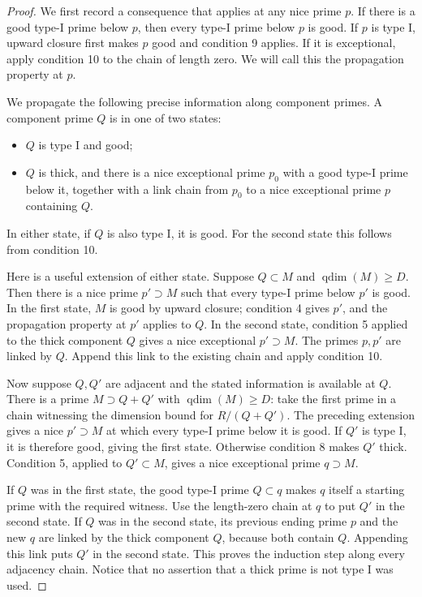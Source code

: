 \documentclass[11pt,a4paper]{article}
\numberwithin{equation}{section}
\theoremstyle{remark}\newtheorem{remark}[theorem]{Remark}
\begin{document}
\begin{proof}
We first record a consequence that applies at any nice prime
\(p\).  If there is a good type-I prime below \(p\), then
every type-I prime below \(p\) is good.  If \(p\) is type I,
upward closure first makes \(p\) good and condition 9 applies.
If it is exceptional, apply condition 10 to the chain of
length zero.  We will call this the propagation property at
\(p\).

We propagate the following precise information along component
primes.  A component prime \(Q\) is in one of two states:
\begin{itemize}
\item \(Q\) is type I and good;
\item \(Q\) is thick, and there is a nice exceptional prime
      \(p_0\) with a good type-I prime below it, together with
      a link chain from \(p_0\) to a nice exceptional prime
      \(p\) containing \(Q\).
\end{itemize}
In either state, if \(Q\) is also type I, it is good.
For the second state this follows from condition 10.

Here is a useful extension of either state.  Suppose
\(Q\subset M\) and \(\operatorname{qdim}(M)\ge D\).
Then there is a nice prime \(p'\supset M\) such that every
type-I prime below \(p'\) is good.  In the first state,
\(M\) is good by upward closure; condition 4 gives \(p'\),
and the propagation property at \(p'\) applies to \(Q\).
In the second state, condition 5 applied to the thick
component \(Q\) gives a nice exceptional \(p'\supset M\).
The primes \(p,p'\) are linked by \(Q\).  Append this link
to the existing chain and apply condition 10.

Now suppose \(Q,Q'\) are adjacent and the stated information
is available at \(Q\).  There is a prime \(M\supset Q+Q'\)
with \(\operatorname{qdim}(M)\ge D\): take the first prime
in a chain witnessing the dimension bound for \(R/(Q+Q')\).
The preceding extension gives a nice \(p'\supset M\) at
which every type-I prime below it is good.
If \(Q'\) is type I, it is therefore good, giving the first
state.  Otherwise condition 8 makes \(Q'\) thick.
Condition 5, applied to \(Q'\subset M\), gives a nice
exceptional prime \(q\supset M\).

If \(Q\) was in the first state, the good type-I prime
\(Q\subset q\) makes \(q\) itself a starting prime with
the required witness.  Use the length-zero chain at \(q\)
to put \(Q'\) in the second state.
If \(Q\) was in the second state, its previous ending prime
\(p\) and the new \(q\) are linked by the thick component
\(Q\), because both contain \(Q\).  Appending this link
puts \(Q'\) in the second state.  This proves the induction
step along every adjacency chain.  Notice that no assertion
that a thick prime is not type I was used.


\end{proof}
\end{document}
